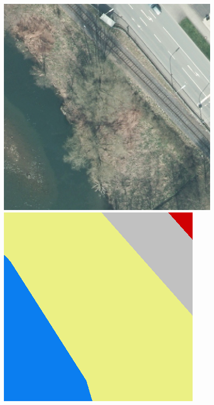 \begin{figure}
    \vspace{3mm}
    \includegraphics[width=\UnetPredictionsImageWidth]{images/unet/147352-image} \hfill
    \includegraphics[width=\UnetPredictionsImageWidth]{images/unet/147352-label} \hfill

\end{figure}
